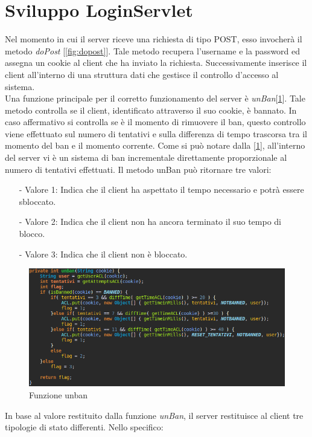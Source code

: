 \documentclass[a4paper,12pt,titlepage,oneside,openany]{book}
\begin{document}
\section{Sviluppo LoginServlet}
Nel momento in cui il server riceve una richiesta di tipo POST, esso invocherà il metodo \textit{doPost} [\ref{fig:dopost}]. 
Tale metodo recupera l'username e la password ed assegna un cookie al client che ha inviato la richiesta. Successivamente inserisce il client all'interno di una struttura dati che gestisce il controllo d'accesso al sistema.\\
Una funzione principale per il corretto funzionamento del server è \textit{unBan}[\ref{fig:unban}]. Tale metodo controlla se il client, identificato attraverso il suo cookie, è bannato. In caso affermativo si controlla se è il momento di rimuovere il ban, questo controllo viene effettuato sul numero di tentativi e sulla differenza di tempo trascorsa tra il momento del ban e il momento corrente.
Come si può notare dalla [\ref{fig:unban}], all'interno del server vi è un sistema di ban incrementale direttamente  proporzionale al numero di tentativi effettuati. Il metodo unBan può ritornare tre valori:
\begin{itemize}
	\item[-] Valore 1: Indica che il client ha aspettato il tempo necessario e potrà essere sbloccato.
	\item[-] Valore 2: Indica che il client non ha ancora terminato il suo tempo di blocco.
	\item[-] Valore 3: Indica che il client non è bloccato.
\end{itemize}
\begin{figure}[H]
	\centering
	\includegraphics[scale=0.5]{unban.png}
	\caption{Funzione unban}
	\label{fig:unban}
\end{figure}
In base al valore restituito dalla funzione \textit{unBan}, il server restituisce al client tre tipologie di stato differenti. Nello specifico:
\end{document}
